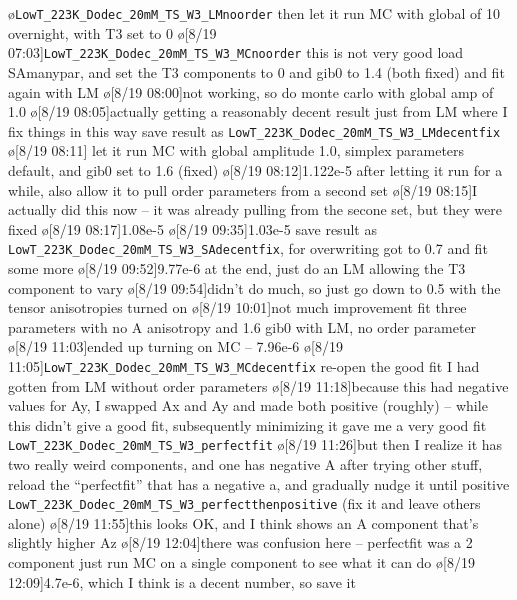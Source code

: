 \begin{err}
\begin{err}
        \o{\texttt{LowT_223K_Dodec_20mM_TS_W3_LMnoorder}}
        then let it run MC with global of 10 overnight,
        with T3 set to 0
        \o[8/19 07:03]{\texttt{LowT_223K_Dodec_20mM_TS_W3_MCnoorder} this is not very good}
        load SAmanypar, and set the T3 components to 0 and gib0 to 1.4 (both fixed) and fit again with LM
        \o[8/19 08:00]{not working, so do monte carlo with global amp of 1.0}
        \o[8/19 08:05]{actually getting a reasonably decent result just from LM where I fix things in this way}
        save result as \texttt{LowT_223K_Dodec_20mM_TS_W3_LMdecentfix}
        \o[8/19 08:11]{}
        let it run MC with global amplitude 1.0, simplex parameters default, and gib0 set to 1.6 (fixed)
        \o[8/19 08:12]{1.122e-5}
        after letting it run for a while, also allow it to pull order
        parameters from a second set
        \o[8/19 08:15]{I actually did this now -- it was already pulling from the secone set, but they were fixed}
        \o[8/19 08:17]{1.08e-5}
        \o[8/19 09:35]{1.03e-5}
        save result as \texttt{LowT_223K_Dodec_20mM_TS_W3_SAdecentfix}, for overwriting
        got to 0.7 and fit some more
        \o[8/19 09:52]{9.77e-6}
        at the end, just do an LM allowing the T3 component to vary
        \o[8/19 09:54]{didn't do much, so just}
        go down to 0.5 with the tensor anisotropies turned on
        \o[8/19 10:01]{not much improvement}
        fit three parameters with no A anisotropy and 1.6 gib0 with LM, no order parameter
        \o[8/19 11:03]{ended up turning on MC -- 7.96e-6}
        \o[8/19 11:05]{\texttt{LowT_223K_Dodec_20mM_TS_W3_MCdecentfix}}
        re-open the good fit I had gotten from LM without order parameters
        \o[8/19 11:18]{because this had negative values for Ay, I swapped Ax and Ay and made both positive (roughly) -- while this didn't give a good fit, subsequently minimizing it gave me a very good fit \texttt{LowT_223K_Dodec_20mM_TS_W3_perfectfit}}
        \o[8/19 11:26]{but then I realize it has two really weird components, and one has negative A}
        after trying other stuff, reload the ``perfectfit'' that has a negative a, and gradually nudge it until positive
        \texttt{LowT_223K_Dodec_20mM_TS_W3_perfectthenpositive}
        (fix it and leave others alone)
        \o[8/19 11:55]{this looks OK, and I think shows an A component that's slightly higher Az}
        \o[8/19 12:04]{there was confusion here -- perfectfit was a 2 component}
        just run MC on a single component to see what it can do
        \o[8/19 12:09]{4.7e-6, which I think is a decent number, so save it}

\end{err}
\end{err}

